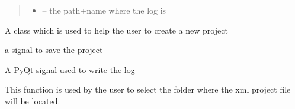 \documentclass[letterpaper,10pt,english]{sphinxmanual}
\begin{document}
\begin{fulllineitems}
\begin{fulllineitems}
\begin{quote}
\begin{description}
\begin{itemize}
\item {} 
 -- the path+name where the log is

\end{itemize}

\end{description}\end{quote}

\end{fulllineitems}


\end{fulllineitems}


\begin{fulllineitems}
\label{\detokenize{index:src_GUI.Main_windows_1.CreateNewProject}}
A class which is used to help the user to create a new project

\begin{fulllineitems}
\label{\detokenize{index:src_GUI.Main_windows_1.CreateNewProject.init_iu}}
\end{fulllineitems}


\begin{fulllineitems}
\label{\detokenize{index:src_GUI.Main_windows_1.CreateNewProject.save_project}}
a signal to save the project

\end{fulllineitems}


\begin{fulllineitems}
\label{\detokenize{index:src_GUI.Main_windows_1.CreateNewProject.send_log}}
A PyQt signal used to write the log

\end{fulllineitems}


\begin{fulllineitems}
\label{\detokenize{index:src_GUI.Main_windows_1.CreateNewProject.setfolder}}
This function is used by the user to select the folder where the xml project file will be located.

\end{fulllineitems}


\end{fulllineitems}
\end{document}
